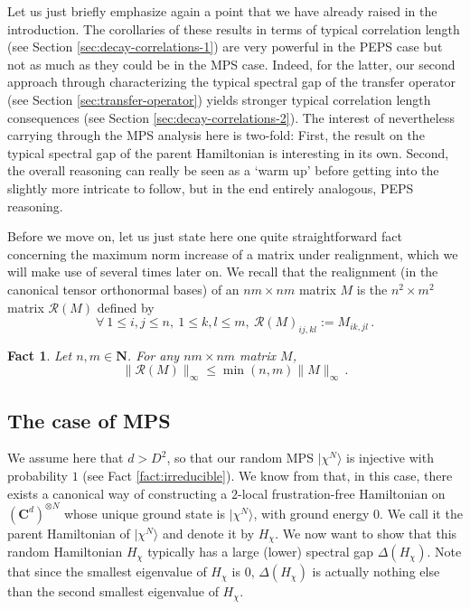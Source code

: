 \documentclass{amsart}
\newtheorem{fact}[theorem]{Fact}
\newcommand{\N}{\mathbf{N}}
\newcommand{\C}{\mathbf{C}}
\renewcommand{\leq}{\leqslant}
\newcommand{\ket}[1]{| #1 \rangle}
\begin{document}
Let us just briefly emphasize again a point that we have already raised in the introduction. The corollaries of these results in terms of typical correlation length (see Section \ref{sec:decay-correlations-1}) are very powerful in the PEPS case but not as much as they could be in the MPS case. Indeed, for the latter, our second approach through characterizing the typical spectral gap of the transfer operator (see Section \ref{sec:transfer-operator}) yields stronger typical correlation length consequences (see Section \ref{sec:decay-correlations-2}). The interest of nevertheless carrying through the MPS analysis here is two-fold: First, the result on the typical spectral gap of the parent Hamiltonian is interesting in its own. Second, the overall reasoning can really be seen as a `warm up' before getting into the slightly more intricate to follow, but in the end entirely analogous, PEPS reasoning.

Before we move on, let us just state here one quite straightforward fact concerning the maximum norm increase of a matrix under realignment, which we will make use of several times later on. We recall that the realignment (in the canonical tensor orthonormal bases) of an $nm\times nm$ matrix $M$ is the $n^2\times m^2$ matrix $\mathcal{R}(M)$ defined by
\[ \forall\ 1\leq i,j \leq n,\ 1\leq k,l\leq m,\ \mathcal{R}(M)_{ij,kl} := M_{ik,jl} \, . \]

\begin{fact} \label{fact:realign}
    Let $n,m\in\N$. For any $nm\times nm$ matrix $M$,
    \[ \|\mathcal{R}(M)\|_{\infty} \leq \min(n,m)\|M\|_{\infty} \, . \]
\end{fact}

\subsection{The case of MPS} \hfill\par\smallskip
\label{sec:parent-hamiltonian-MPS}

We assume here that $d>D^2$, so that our random MPS $\ket{\chi^N}$ is injective with probability $1$ (see Fact \ref{fact:irreducible}). We know from \cite{CPGVW} that, in this case, there exists a canonical way of constructing a $2$-local frustration-free Hamiltonian on $(\C^d)^{\otimes N}$ whose unique ground state is $\ket{\chi^N}$, with ground energy $0$. We call it the parent Hamiltonian of $\ket{\chi^N}$ and denote it by $H_{\chi}$. We now want to show that this random Hamiltonian $H_{\chi}$ typically has a large (lower) spectral gap $\Delta(H_{\chi})$. Note that since the smallest eigenvalue of $H_{\chi}$ is $0$, $\Delta(H_{\chi})$ is actually nothing else than the second smallest eigenvalue of $H_{\chi}$.
\end{document}
